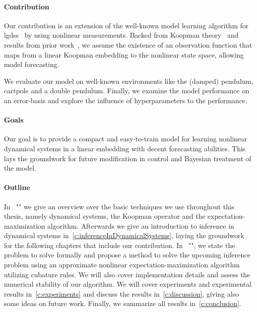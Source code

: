 \paragraph{Contribution}
	Our contribution is an extension of the well-known model learning algorithm for \acp{lgds}~\cite{ghahramaniParameterEstimationLinear1996,minkaHiddenMarkovModels1999} by using nonlinear measurements. Backed from Koopman theory~\cite{koopmanHamiltonianSystemsTransformation1931} and results from prior work~\cite{luschDeepLearningUniversal2018}, we assume the existence of an observation function that maps from a linear Koopman embedding to the nonlinear state space, allowing model forecasting.

	We evaluate our model on well-known environments like the (damped) pendulum, cartpole and a double pendulum. Finally, we examine the model performance on an error-basis and explore the influence of hyperparameters to the performance.

\paragraph{Goals}
	Our goal is to provide a compact and easy-to-train model for learning nonlinear dynamical systems in a linear embedding with decent forecasting abilities. This lays the groundwork for future modification in control and Bayesian treatment of the model.

\paragraph{Outline}
	In \chapterautorefname~"" we give an overview over the basic techniques we use throughout this thesis, namely dynamical systems, the Koopman operator and the expectation-maximization algorithm. Afterwards we give an introduction to inference in dynamical systems in~\autoref{c:inferenceInDynamicalSystems}, laying the groundwork for the following chapters that include our contribution. In \chapterautorefname~"", we state the problem to solve formally and propose a method to solve the upcoming inference problem using an approximate nonlinear expectation-maximization algorithm utilizing cubature rules. We will also cover implementation details and assess the numerical stability of our algorithm. We will cover experiments and experimental results in~\autoref{c:experiments} and discuss the results in~\autoref{c:discussion}, giving also some ideas on future work. Finally, we summarize all results in~\autoref{c:conclusion}.
